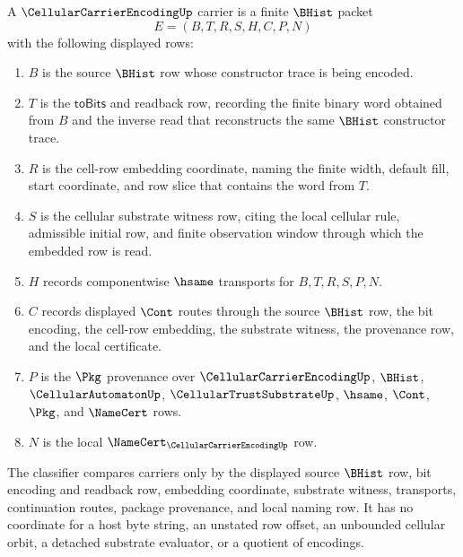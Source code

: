 \begin{definition}
\label{def:cellular-carrier-encoding-carrier}
A $\CellularCarrierEncodingUp$ carrier is a finite $\BHist$ packet
$$
E=(B,T,R,S,H,C,P,N)
$$
with the following displayed rows:
\begin{enumerate}
\item $B$ is the source $\BHist$ row whose constructor trace is being encoded.
\item $T$ is the $\mathsf{toBits}$ and readback row, recording the finite binary word obtained from $B$ and the inverse read that reconstructs the same $\BHist$ constructor trace.
\item $R$ is the cell-row embedding coordinate, naming the finite width, default fill, start coordinate, and row slice that contains the word from $T$.
\item $S$ is the cellular substrate witness row, citing the local cellular rule, admissible initial row, and finite observation window through which the embedded row is read.
\item $H$ records componentwise $\hsame$ transports for $B,T,R,S,P,N$.
\item $C$ records displayed $\Cont$ routes through the source $\BHist$ row, the bit encoding, the cell-row embedding, the substrate witness, the provenance row, and the local certificate.
\item $P$ is the $\Pkg$ provenance over $\CellularCarrierEncodingUp$, $\BHist$, $\CellularAutomatonUp$, $\CellularTrustSubstrateUp$, $\hsame$, $\Cont$, $\Pkg$, and $\NameCert$ rows.
\item $N$ is the local $\NameCert_{\CellularCarrierEncodingUp}$ row.
\end{enumerate}
The classifier compares carriers only by the displayed source $\BHist$ row, bit encoding and readback row, embedding coordinate, substrate witness, transports, continuation routes, package provenance, and local naming row. It has no coordinate for a host byte string, an unstated row offset, an unbounded cellular orbit, a detached substrate evaluator, or a quotient of encodings.
\end{definition}

